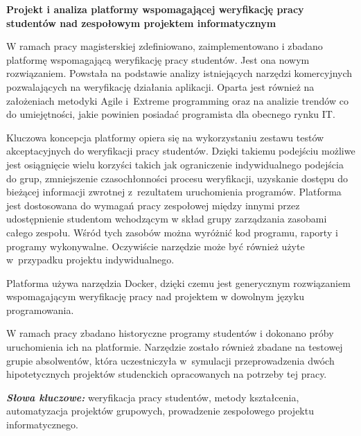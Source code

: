\newpage
\vspace{10cm}

\newpage
\begin{center}
	\textbf{Projekt i analiza platformy wspomagającej weryfikację pracy studentów
nad zespołowym projektem informatycznym}
\end{center}
 \newline

W ramach pracy magisterskiej zdefiniowano, zaimplementowano i zbadano platformę wspomagającą weryfikację pracy studentów.
Jest ona nowym rozwiązaniem.
Powstała na podstawie analizy istniejących narzędzi komercyjnych pozwalających na weryfikację działania aplikacji.
Oparta jest również na założeniach metodyki Agile i~Extreme programming oraz na analizie trendów co do umiejętności, jakie powinien posiadać programista dla obecnego rynku IT.

Kluczowa koncepcja platformy opiera się na wykorzystaniu zestawu testów akceptacyjnych do weryfikacji pracy studentów.
Dzięki takiemu podejściu możliwe jest osiągnięcie wielu korzyści takich jak ograniczenie indywidualnego podejścia do grup, zmniejszenie czasochłonności procesu weryfikacji, uzyskanie dostępu do bieżącej informacji zwrotnej z~rezultatem uruchomienia programów.
Platforma jest dostosowana do wymagań pracy zespołowej między innymi przez udostępnienie studentom wchodzącym w skład grupy zarządzania zasobami całego zespołu.
Wśród tych zasobów można wyróżnić kod programu, raporty i programy wykonywalne.
Oczywiście narzędzie może być również użyte w~przypadku projektu indywidualnego.

Platforma używa narzędzia Docker, dzięki czemu jest generycznym rozwiązaniem wspomagającym weryfikację pracy nad projektem w dowolnym języku programowania.

W ramach pracy zbadano historyczne programy studentów i dokonano próby uruchomienia ich na platformie.
Narzędzie zostało również zbadane na testowej grupie absolwentów, która uczestniczyła w~symulacji przeprowadzenia dwóch hipotetycznych projektów studenckich opracowanych na potrzeby tej pracy. \newline



\textit{\textbf{Słowa kluczowe:}} weryfikacja pracy studentów, metody kształcenia, automatyzacja projektów grupowych, prowadzenie zespołowego projektu informatycznego.

	\vspace{1cm}

